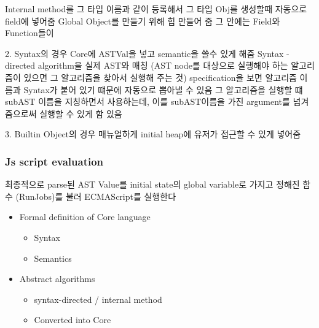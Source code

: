 Internal method를 그 타입 이름과 같이 등록해서 그 타입 Obj를 생성할때 자동으로 field에 넣어줌
Global Object를 만들기 위해 힙 만들어 줌 그 안에는 Field와 Function들이 

2. Syntax의 경우 Core에 ASTVal을 넣고 semantic을 쓸수 있게 해줌
Syntax - directed algorithm을 실제 AST와 매칭 (AST node를 대상으로 실행해야 하는 알고리즘이 있으면 그 알고리즘을 찾아서 실행해 주는 것)
specification을 보면 알고리즘 이름과 Syntax가 붙어 있기 떄문에 자동으로 뽑아낼 수 있음
그 알고리즘을 실행할 떄 subAST 이름을 지칭하면서 사용하는데, 이를 subAST이름을 가진 argument를 넘겨줌으로써 실행할 수 있게 함
있음

3. Builtin Object의 경우 매뉴얼하게 initial heap에 유저가 접근할 수 있게 넣어줌

\subsubsection{Js script evaluation}

최종적으로 parse된 AST Value를 initial state의 global variable로 가지고 정해진 함수 (RunJobs)를 불러 ECMAScript를 실행한다




\begin{itemize}
  \item Formal definition of Core language
    \begin{itemize}
      \item Syntax
      \item Semantics
    \end{itemize}
  \item Abstract algorithms
    \begin{itemize}
      \item syntax-directed / internal method
      \item Converted into Core
    \end{itemize}
\end{itemize}
